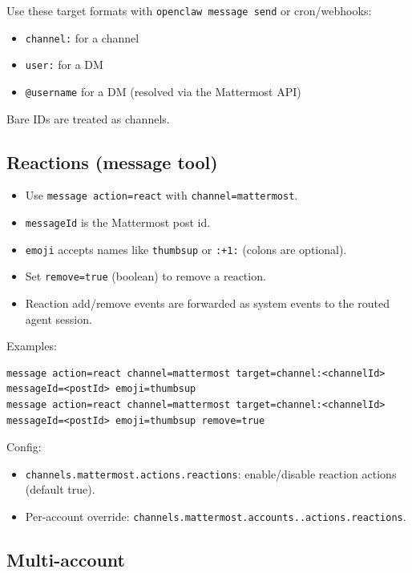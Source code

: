 Use these target formats with \texttt{openclaw message send} or cron/webhooks:

\begin{itemize}
  \item \texttt{channel:} for a channel
  \item \texttt{user:} for a DM
  \item \texttt{@username} for a DM (resolved via the Mattermost API)
\end{itemize}


Bare IDs are treated as channels.

\subsection{Reactions (message tool)}


\begin{itemize}
  \item Use \texttt{message action=react} with \texttt{channel=mattermost}.
  \item \texttt{messageId} is the Mattermost post id.
  \item \texttt{emoji} accepts names like \texttt{thumbsup} or \texttt{:+1:} (colons are optional).
  \item Set \texttt{remove=true} (boolean) to remove a reaction.
  \item Reaction add/remove events are forwarded as system events to the routed agent session.
\end{itemize}


Examples:

\begin{lstlisting}
message action=react channel=mattermost target=channel:<channelId> messageId=<postId> emoji=thumbsup
message action=react channel=mattermost target=channel:<channelId> messageId=<postId> emoji=thumbsup remove=true
\end{lstlisting}


Config:

\begin{itemize}
  \item \texttt{channels.mattermost.actions.reactions}: enable/disable reaction actions (default true).
  \item Per-account override: \texttt{channels.mattermost.accounts..actions.reactions}.
\end{itemize}


\subsection{Multi-account}


